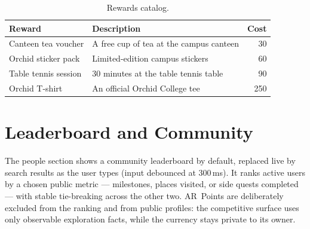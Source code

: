\begin{table}[H]
  \centering\small
  \begin{tabular}{@{}llr@{}}
    \toprule
    \textbf{Reward} & \textbf{Description} & \textbf{Cost} \\
    \midrule
    Canteen tea voucher & A free cup of tea at the campus canteen & 30 \\
    Orchid sticker pack & Limited-edition campus stickers & 60 \\
    Table tennis session & 30 minutes at the table tennis table & 90 \\
    Orchid T-shirt & An official Orchid College tee & 250 \\
    \bottomrule
  \end{tabular}
  \caption{Rewards catalog.}
  \label{tab:rewards}
\end{table}

\section{Leaderboard and Community}
The people section shows a community leaderboard by default, replaced live
by search results as the user types (input debounced at 300\,ms). It ranks
active users by a chosen public metric --- milestones, places visited, or
side quests completed --- with stable tie-breaking across the other two.
AR~Points are deliberately excluded from the ranking and from public
profiles: the competitive surface uses only observable exploration facts,
while the currency stays private to its owner.
